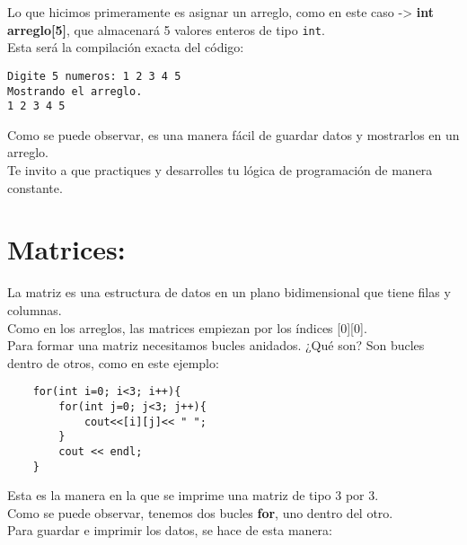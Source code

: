 \documentclass[
  11pt,
  a4paper,
  DIV=11,
  numbers=noendperiod]{scrreprt}
\begin{document}
Lo que hicimos primeramente es asignar un arreglo, como en este caso
-\textgreater{} \textbf{int arreglo{[}5{]}}, que almacenará 5 valores
enteros de tipo \texttt{int}.\\
Esta será la compilación exacta del código:

\begin{tcolorbox}[custombox]
\begin{verbatim}
Digite 5 numeros: 1 2 3 4 5
Mostrando el arreglo.
1 2 3 4 5
\end{verbatim}
\end{tcolorbox}

Como se puede observar, es una manera fácil de guardar datos y
mostrarlos en un arreglo.\\
Te invito a que practiques y desarrolles tu lógica de programación de
manera constante.

\section{Matrices:}\label{matrices}

La matriz es una estructura de datos en un plano bidimensional que tiene
filas y columnas.\\
Como en los arreglos, las matrices empiezan por los índices
{[}0{]}{[}0{]}.\\
Para formar una matriz necesitamos bucles anidados. ¿Qué son? Son bucles
dentro de otros, como en este ejemplo:

\begin{tcolorbox}[custombox]
\begin{verbatim}
    for(int i=0; i<3; i++){
        for(int j=0; j<3; j++){
            cout<<[i][j]<< " ";
        }
        cout << endl;
    }
\end{verbatim}
\end{tcolorbox}

Esta es la manera en la que se imprime una matriz de tipo 3 por 3.\\
Como se puede observar, tenemos dos bucles \textbf{for}, uno dentro del
otro.\\
Para guardar e imprimir los datos, se hace de esta manera:
\end{document}
